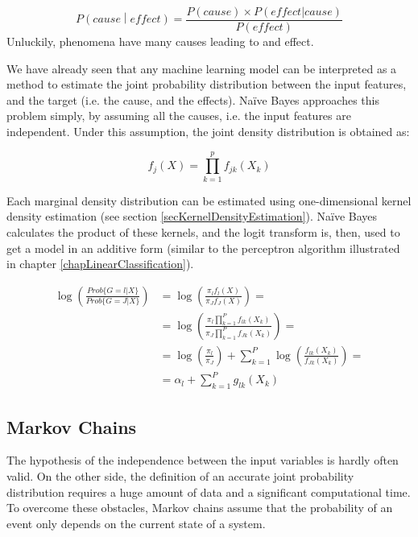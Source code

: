 \begin{equation}
        P\left(cause\middle| effect\right)=\frac{P\left(cause\right)\times P(effect|cause)}{P(effect)}
        \label{eq_naiveBayes1}
\end{equation}
Unluckily, phenomena have many causes leading to and effect. \par

We have already seen that any machine learning model can be interpreted as a method to estimate the joint probability distribution between the input features, and the target (i.e. the cause, and the effects). Naïve Bayes approaches this problem simply, by assuming all the causes, i.e. the input features are independent. Under this assumption, the joint density distribution is obtained as:

\begin{equation}
        f_j\left(X\right)=\prod_{k=1}^{p}{f_{jk}(X_k)}
        \label{eq_naiveBayes2}
\end{equation}

Each marginal density distribution can be estimated using one-dimensional kernel density estimation (see section \ref{secKernelDensityEstimation}). Naïve Bayes calculates the product of these kernels, and the logit transform is, then, used to get a model in an additive form (similar to the perceptron algorithm illustrated in chapter \ref{chapLinearClassification}).

\begin{equation}
\begin{split}
        \log\left(\frac{Prob\{G=l|X\}}{Prob\{G=J|X\}}\right) & =\log\left(\frac{\pi_lf_l(X)}{\pi_Jf_J(X)}\right)=\\
        & =\log{\left(\frac{\pi_l\prod_{k=1}^{P}{f_{lk}(X_k)}}{\pi_J\prod_{k=1}^{P}{f_{Jk}(X_k)}}\right)=}\\
        & =\log{\left(\frac{\pi_l}{\pi_J}\right)+\sum_{k=1}^{P}\log{\left(\frac{f_{lk}(X_k)}{f_{Jk}(X_k)}\right)=}}\\
        & =\alpha_l+\sum_{k=1}^{P}{g_{lk}(X_k)}
\end{split}
\label{eq_naiveBayes3}
\end{equation}

\subsection{Markov Chains} \label{secMarkovChain}
The hypothesis of the independence between the input variables is hardly often valid. On the other side, the definition of an accurate joint probability distribution requires a huge amount of data and a significant computational time. To overcome these obstacles, Markov chains assume that the probability of an event only depends on the current state of a system. \par

